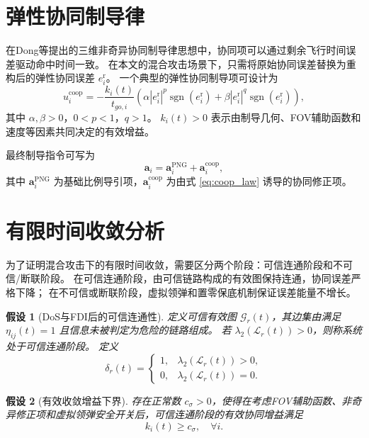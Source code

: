 \documentclass[UTF8,a4paper,11pt]{ctexart}
\newtheorem{assumption}{假设}
\newcommand{\sgn}{\operatorname{sgn}}
\begin{document}
\section{弹性协同制导律}

在Dong等提出的三维非奇异协同制导律思想中，协同项可以通过剩余飞行时间误差驱动命中时间一致。
在本文的混合攻击场景下，只需将原始协同误差替换为重构后的弹性协同误差 $e_i^{\mathrm{r}}$。
一个典型的弹性协同制导项可设计为
\begin{equation}
u_i^{\mathrm{coop}}
=
-\frac{k_i(t)}{t_{go,i}}
\left(
\alpha |e_i^{\mathrm{r}}|^p\sgn(e_i^{\mathrm{r}})
+
\beta |e_i^{\mathrm{r}}|^q\sgn(e_i^{\mathrm{r}})
\right),
\label{eq:coop_law}
\end{equation}
其中 $\alpha,\beta>0$，$0<p<1$，$q>1$。
$k_i(t)>0$ 表示由制导几何、FOV辅助函数和速度等因素共同决定的有效增益。

最终制导指令可写为
\begin{equation}
\bm a_i
=
\bm a_i^{\mathrm{PNG}}
+
\bm a_i^{\mathrm{coop}},
\label{eq:total_guidance}
\end{equation}
其中 $\bm a_i^{\mathrm{PNG}}$ 为基础比例导引项，$\bm a_i^{\mathrm{coop}}$ 为由式 \eqref{eq:coop_law} 诱导的协同修正项。

\section{有限时间收敛分析}

为了证明混合攻击下的有限时间收敛，需要区分两个阶段：可信连通阶段和不可信/断联阶段。
在可信连通阶段，由可信链路构成的有效图保持连通，协同误差严格下降；
在不可信或断联阶段，虚拟领弹和置零保底机制保证误差能量不增长。

\begin{assumption}[DoS与FDI后的可信连通性]
定义可信有效图 $\mathcal{G}_r(t)$，其边集由满足 $\eta_{ij}(t)=1$ 且信息未被判定为危险的链路组成。
若 $\lambda_2(\mathcal{L}_r(t))>0$，则称系统处于可信连通阶段。
定义
\begin{equation}
\delta_r(t)=
\begin{cases}
1, & \lambda_2(\mathcal{L}_r(t))>0,\\
0, & \lambda_2(\mathcal{L}_r(t))=0.
\end{cases}
\label{eq:trusted_delta}
\end{equation}
\end{assumption}

\begin{assumption}[有效收敛增益下界]
存在正常数 $c_\sigma>0$，使得在考虑FOV辅助函数、非奇异修正项和虚拟领弹安全开关后，可信连通阶段的有效协同增益满足
\begin{equation}
k_i(t)\ge c_\sigma,\quad \forall i.
\label{eq:gain_lower_bound}
\end{equation}
\end{assumption}
\end{document}
